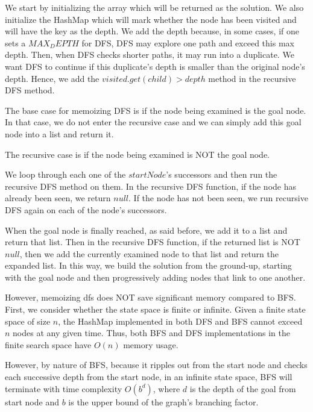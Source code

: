 \documentclass[a4paper]{report}
\begin{document}
We start by initializing the array which will be returned as the solution. We also initialize the HashMap which will
mark whether the node has been visited and will have the key as the depth. We add the depth because, in some cases, 
if one sets a $MAX_DEPTH$ for DFS, DFS may explore one path and exceed this max depth. Then, when DFS checks shorter
paths, it may run into a duplicate. We want DFS to continue if this duplicate's depth is smaller than the original node's
depth. Hence, we add the $visited.get(child) > depth$ method in the recursive DFS method.

The base case for memoizing DFS is if the node being examined is the goal node. In that case, we do not enter the recursive case and we can simply add this goal node into a list
and return it.

The recursive case is if the node being examined is NOT the goal node. 

We loop through each one of the $startNode$'s successors and then run the recursive DFS method on them. In the
recursive DFS function, if the node has already been seen, we return $null$. If the node has not been seen,
we run recursive DFS again on each of the node's successors.

When the goal node is finally reached, as said before, we add it to a list and return that list. Then in the
recursive DFS function, if the returned list is NOT $null$, then we add the currently examined node to that list
and return the expanded list. In this way, we build the solution from the ground-up, starting with the
goal node and then progressively adding nodes that link to one another.

However, memoizing dfs does NOT save significant memory compared to BFS. First, we consider whether the state space is finite or infinite. 
Given a finite state space of size $n$, the HashMap implemented in both DFS and BFS cannot exceed $n$ nodes at any given time. Thus,
both BFS and DFS implementations in the finite search space have $O(n)$ memory usage. 

However, by nature of BFS, because it ripples out from the
start node and checks each successive depth from the start node, in an infinite state space, BFS will terminate with time complexity $O(b^d)$, 
where $d$ is the depth of the goal from start node and $b$ is the upper bound of the graph's branching factor. 
\end{document}
